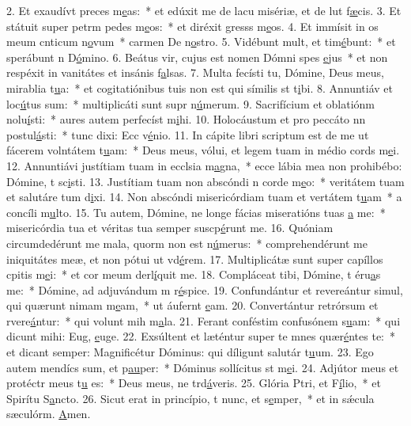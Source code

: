 2. Et exaudívt preces m\uline{e}as:~* et edúxit me de lacu misériæ, et de lut f\uline{æ}cis.
3. Et státuit super petrm pedes m\uline{e}os:~* et diréxit gresss m\uline{e}os.
4. Et immísit in os meum cnticum n\uline{o}vum~* carmen De n\uline{o}stro.
5. Vidébunt mult, et tim\uline{é}bunt:~* et sperábunt n D\uline{ó}mino.
6. Beátus vir, cujus est nomen Dómni spes \uline{e}jus~* et non respéxit in vanitátes et insánis f\uline{a}lsas.
7. Multa fecísti tu, Dómine, Deus meus, mirablia t\uline{u}a:~* et cogitatiónibus tuis non est qui símilis st t\uline{i}bi.
8. Annuntiáv et loc\uline{ú}tus sum:~* multiplicáti sunt supr n\uline{ú}merum.
9. Sacrifícium et oblatiónm nolu\uline{í}sti:~* aures autem perfecíst m\uline{i}hi.
10. Holocáustum et pro peccáto nn postul\uline{á}sti:~* tunc dixi: Ecc v\uline{é}nio.
11. In cápite libri scriptum est de me ut fácerem volntátem t\uline{u}am:~* Deus meus, vólui, et legem tuam in médio cords m\uline{e}i.
12. Annuntiávi justítiam tuam in ecclsia m\uline{a}gna,~* ecce lábia mea non prohibébo: Dómine, t sc\uline{i}sti.
13. Justítiam tuam non abscóndi n corde m\uline{e}o:~* veritátem tuam et salutáre tum d\uline{i}xi.
14. Non abscóndi misericórdiam tuam et vertátem t\uline{u}am~* a concíli m\uline{u}lto.
15. Tu autem, Dómine, ne longe fácias miseratións tuas \uline{a} me:~* misericórdia tua et véritas tua semper suscp\uline{é}runt me.
16. Quóniam circumdedérunt me mala, quorm non est n\uline{ú}merus:~* comprehendérunt me iniquitátes meæ, et non pótui ut vd\uline{é}rem.
17. Multiplicátæ sunt super capíllos cpitis m\uline{e}i:~* et cor meum derl\uline{í}quit me.
18. Compláceat tibi, Dómine, t éru\uline{a}s me:~* Dómine, ad adjuvándum m r\uline{é}spice.
19. Confundántur et revereántur simul, qui quærunt nimam m\uline{e}am,~* ut áufernt \uline{e}am.
20. Convertántur retrórsum et rvere\uline{á}ntur:~* qui volunt mih m\uline{a}la.
21. Ferant conféstim confusónem s\uline{u}am:~* qui dicunt mihi: Eug, \uline{e}uge.
22. Exsúltent et læténtur super te mnes quær\uline{é}ntes te:~* et dicant semper: Magnificétur Dóminus: qui díligunt salutár t\uline{u}um.
23. Ego autem mendícs sum, et p\uline{au}per:~* Dóminus sollícitus st m\uline{e}i.
24. Adjútor meus et protéctr meus t\uline{u} es:~* Deus meus, ne trd\uline{á}veris.
25. Glória Ptri, et F\uline{í}lio,~* et Spirítu S\uline{a}ncto.
26. Sicut erat in princípio, t nunc, et s\uline{e}mper,~* et in sǽcula sæculórm. \uline{A}men.
